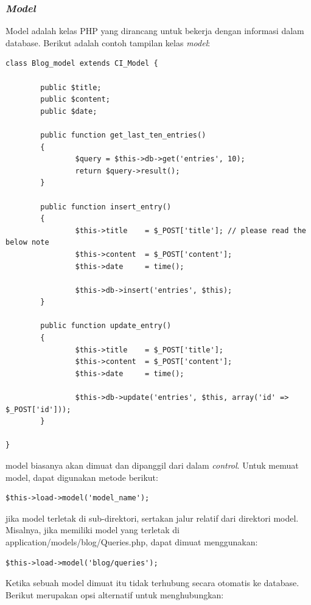 \subsubsection{\textit{Model}}
\label{sec:Model}
Model adalah kelas PHP yang dirancang untuk bekerja dengan informasi dalam database\cite{codeigniter}. Berikut adalah contoh tampilan kelas \textit{model}:
\begin{lstlisting}[basicstyle=\ttfamily, frame=single,
    columns=fullflexible, breaklines=true, numbers=none]
class Blog_model extends CI_Model {

        public $title;
        public $content;
        public $date;

        public function get_last_ten_entries()
        {
                $query = $this->db->get('entries', 10);
                return $query->result();
        }

        public function insert_entry()
        {
                $this->title    = $_POST['title']; // please read the below note
                $this->content  = $_POST['content'];
                $this->date     = time();

                $this->db->insert('entries', $this);
        }

        public function update_entry()
        {
                $this->title    = $_POST['title'];
                $this->content  = $_POST['content'];
                $this->date     = time();

                $this->db->update('entries', $this, array('id' => $_POST['id']));
        }

}
    \end{lstlisting}
    model biasanya akan dimuat dan dipanggil dari dalam \textit{control}. Untuk memuat model, dapat digunakan metode berikut:
    \begin{lstlisting}[basicstyle=\ttfamily, frame=single,
    columns=fullflexible, breaklines=true, numbers=none]
$this->load->model('model_name');
    \end{lstlisting}
    jika model terletak di sub-direktori, sertakan jalur relatif dari direktori model. Misalnya, jika memiliki model yang terletak di application/models/blog/Queries.php, dapat dimuat menggunakan:
    \begin{lstlisting}[basicstyle=\ttfamily, frame=single,
    columns=fullflexible, breaklines=true, numbers=none]
$this->load->model('blog/queries');
    \end{lstlisting}
    Ketika sebuah model dimuat itu tidak terhubung secara otomatis ke database. Berikut merupakan opsi alternatif untuk menghubungkan:
